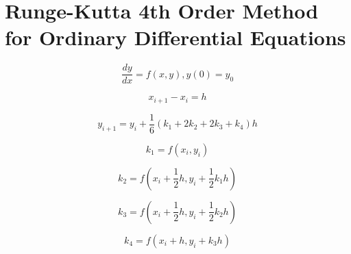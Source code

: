 \section{Runge-Kutta 4th Order Method for Ordinary Differential Equations}

\[\frac{dy}{dx} = f(x, y), y(0) = y_0\]

\[x_{i + 1} - x_i = h\]

\[y_{i + 1} = y_i + \frac{1}{6}(k_1 + 2 k_2 + 2 k_3 + k_4) h\]

\[k_1 = f(x_i, y_i)\]

\[k_2 = f(x_i + \frac{1}{2} h, y_i + \frac{1}{2} k_1 h)\]

\[k_3 = f(x_i + \frac{1}{2} h, y_i + \frac{1}{2} k_2 h)\]

\[k_4 = f(x_i + h, y_i + k_3 h)\]
